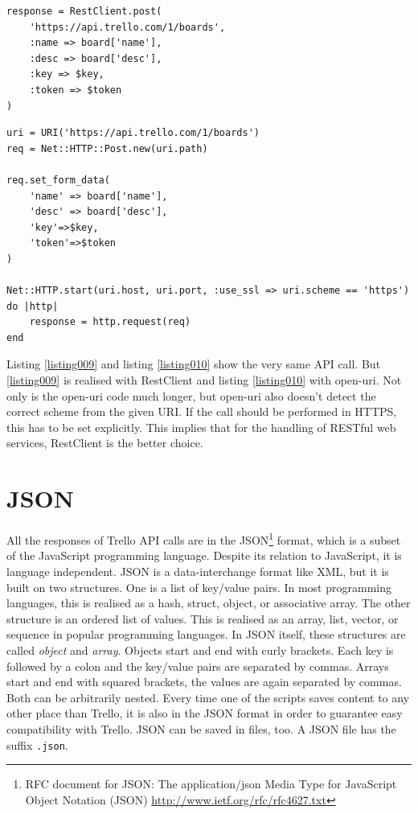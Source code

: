 \begin{lstlisting}[aboveskip=1\baselineskip, caption=POST request using RestClient., label=listing009]
response = RestClient.post(
	'https://api.trello.com/1/boards',
	:name => board['name'], 
	:desc => board['desc'],
	:key => $key,
	:token => $token
)
\end{lstlisting}

\begin{lstlisting}[aboveskip=1\baselineskip, caption=POST request with open-uri., label=listing010]
uri = URI('https://api.trello.com/1/boards')
req = Net::HTTP::Post.new(uri.path)

req.set_form_data(
	'name' => board['name'], 
	'desc' => board['desc'],
	'key'=>$key,
	'token'=>$token
)

Net::HTTP.start(uri.host, uri.port, :use_ssl => uri.scheme == 'https') do |http|
	response = http.request(req)
end
\end{lstlisting}

Listing \ref{listing009} and listing \ref{listing010} show the very same API call. But \ref{listing009} is realised with RestClient and listing \ref{listing010} with open-uri. Not only is the open-uri code much longer, but open-uri also doesn't detect the correct scheme from the given URI. If the call should be performed in HTTPS, this has to be set explicitly. This implies that for the handling of RESTful web services, RestClient is the better choice.


\section{JSON}\label{jsonsec}
All the responses of Trello API calls are in the JSON\footnote{RFC document for JSON: The application/json Media Type for JavaScript Object Notation (JSON)  \url{http://www.ietf.org/rfc/rfc4627.txt}} format, which is a subset of the JavaScript programming language. Despite its relation to JavaScript, it is language independent. JSON is a data-interchange format like XML, but it is built on two structures. One is a list of key/value pairs. In most programming languages, this is realised as a hash, struct, object, or associative array. The other structure is an ordered list of values. This is realised as an array, list, vector, or sequence in popular programming languages. In JSON itself, these structures are called \emph{object} and \emph{array}. Objects start and end with curly brackets. Each key is followed by a colon and the key/value pairs are separated by commas. Arrays start and end with squared brackets, the values are again separated by commas. Both can be arbitrarily nested. Every time one of the scripts saves content to any other place than Trello, it is also in the JSON format in order to guarantee easy compatibility with Trello. JSON can be saved in files, too. A JSON file has the suffix \texttt{.json}. \cite{json}

